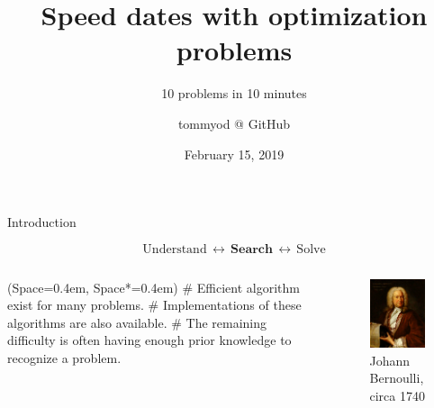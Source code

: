 \documentclass[11pt, aspectratio=149]{beamer}
\title{Speed dates with optimization problems}
\subtitle{10 problems in 10 minutes}
\institute{}
\author{{\footnotesize tommyod @ GitHub}}
\date{February 15, 2019}
\newcommand{\listSpace}{0.4em}
\theoremstyle{plain}
\begin{document}
\maketitle
	
\begin{frame}[fragile]{Introduction}
	
	\begin{equation*}
	\text{Understand}
	 \, \leftrightarrow \,
	 \textbf{Search} 
	 \, \leftrightarrow \,
	 \text{Solve}
	\end{equation*}
	
	\begin{columns}
		\begin{column}{0.55\textwidth}
	\begin{easylist}[itemize]
		\ListProperties(Space=\listSpace, Space*=\listSpace)
		# Efficient algorithm exist for many problems.
		# Implementations of these algorithms are also available.
		# The remaining difficulty is often having enough prior knowledge to recognize a problem. 
	\end{easylist}
		\end{column}
		\begin{column}{0.45\textwidth}%
			\begin{figure}
				\centering
				\includegraphics[width=0.75\linewidth]{figs/Johann_Bernoulli.jpg}
				\caption{{\scriptsize Johann Bernoulli, circa 1740}}
			\end{figure}
		\end{column}
	\end{columns}
\end{frame}
\end{document}

